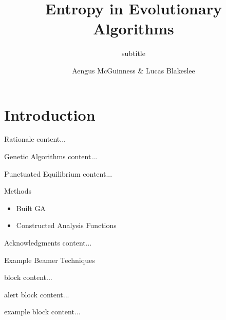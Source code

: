 \documentclass{beamer}
\title{Entropy in Evolutionary Algorithms}
\subtitle{subtitle}
\author{Aengus McGuinness \& Lucas Blakeslee}
\begin{document}
	
\begin{frame}
\begin{titlepage}
\end{titlepage}
\end{frame}

\section{Introduction}

\begin{frame}{Rationale}
	content...
\end{frame}


\begin{frame}{Genetic Algorithms}
	content...
\end{frame}

\begin{frame}{Punctuated Equilibrium}
	content...
\end{frame}

\begin{frame}{Methods}
	\begin{itemize}
		\item Built GA
		\item Constructed Analysis Functions
	\end{itemize}
\end{frame}

\begin{frame}{Acknowledgments}
	content...
\end{frame}

\begin{frame}{Example Beamer Techniques}
	\begin{block}{block}
		content...
	\end{block}
	\begin{alertblock}{alert block}
		content...
	\end{alertblock}
	\begin{exampleblock}{example block}
		content...
	\end{exampleblock}
\end{frame}
\end{document}
